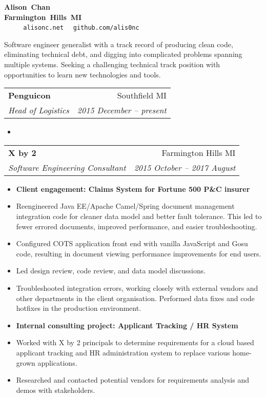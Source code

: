 \documentclass[letterpaper,10pt]{article}
\makeatletter
\newlength{\listsep}
\newcommand{\resitem}[1]{\item #1 \vspace{-2pt}}
\newcommand{\resheading}[1]{\vspace{4pt}
  \parbox{\textwidth}{
      \framebox[\textwidth][l]{
          {\textbf{\sffamily{\large #1}}}
      }
  }
}
\newcommand{\ressubheading}[4]{
\begin{tabular*}{\textwidth}{l@{\cftdotfill{\cftsecdotsep}\extracolsep{\fill}}r}
        \textbf{#1} & #2 \\
        \textit{#3} & \textit{#4} \\
\end{tabular*}\vspace{-6pt}}
\makeatother
\begin{document}
\ifdef{\MONSTER}{\def\PUBLIC{}}{}
\ifdef{\DICE}{\def\PUBLIC{}}{}

\parbox{\textwidth}{\centering
    \textbf{{\Large Alison~Chan}} \\
    \textbf{Farmington~Hills~MI} \\
    ~\textbullet~%
    ~\textbullet~%
    \texttt{alisonc.net}~\textbullet~%
    \texttt{github.com/alis0nc}
}
\vspace{6pt}

{\large
Software engineer generalist with a track record of producing clean code, eliminating technical debt,
and digging into complicated problems spanning multiple systems. 
Seeking a challenging technical track position with opportunities to learn new technologies and tools.
}

\resheading{Professional Experience}

\def\OMITVOLUNTEER{}
\ifdef{\OMITVOLUNTEER}{}
{
\ressubheading{Penguicon}{Southfield MI}{Head of Logistics}{2015 December -- present}
\begin{itemize} \itemsep \listsep \small
    \resitem{}
\end{itemize}
}

\ressubheading{X by 2}{Farmington Hills MI}{Software Engineering Consultant}{2015 October -- 2017 August}
\begin{itemize}\itemsep \listsep  \small
    \resitem{{\bf Client engagement: Claims System for Fortune 500 P\&C insurer}}
    \resitem{Reengineered Java EE/Apache Camel/Spring document management integration code for cleaner data model 
    	     and better fault tolerance. This led to fewer errored documents, improved performance, and easier troubleshooting.}
    \resitem{Configured COTS application front end with vanilla JavaScript and Gosu code, resulting in document viewing 
    	     performance improvements for end users.}
    \resitem{Led design review, code review, and data model discussions.}
    \resitem{Troubleshooted integration errors, working closely with external vendors and other departments in the client 
    	     organisation. Performed data fixes and code hotfixes in the production environment.}
    \resitem{{\bf Internal consulting project: Applicant Tracking / HR System}}
    \resitem{Worked with X by 2 principals to determine requirements for a cloud based applicant tracking
             and HR administration system to replace various home-grown applications.}
    \resitem{Researched and contacted potential vendors for requirements analysis and demos with stakeholders.}
\end{itemize}
\end{document}
